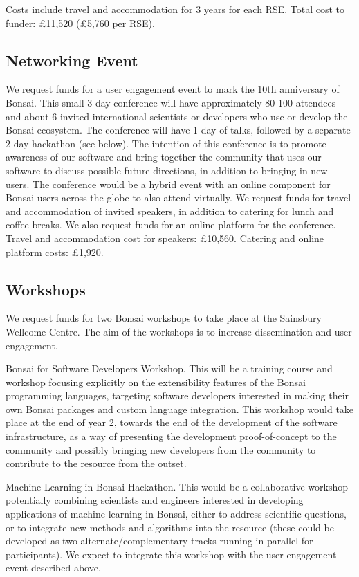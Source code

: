 \documentclass[a4paper,11pt]{article}
\begin{document}
Costs include travel and accommodation for 3 years for each RSE. Total cost to funder: £11,520 (£5,760 per RSE).

\subsection*{Networking Event}

We request funds for a user engagement event to mark the 10th anniversary of Bonsai. This small 3-day conference will have approximately 80-100 attendees and about 6 invited international scientists or developers who use or develop the Bonsai ecosystem. The conference will have 1 day of talks, followed by a separate 2-day hackathon (see below). The intention of this conference is to promote awareness of our software and bring together the community that uses our software to discuss possible future directions, in addition to bringing in new users. The conference would be a hybrid event with an online component for Bonsai users across the globe to also attend virtually. We request funds for travel and accommodation of invited speakers, in addition to catering for lunch and coffee breaks. We also request funds for an online platform for the conference. Travel and accommodation cost for speakers: £10,560. Catering and online platform costs: £1,920.

\subsection{Workshops} 

We request funds for two Bonsai workshops to take place at the Sainsbury Wellcome Centre. The aim of the workshops is to increase dissemination and user engagement. 

Bonsai for Software Developers Workshop. This will be a training course and workshop focusing explicitly on the extensibility features of the Bonsai programming languages, targeting software developers interested in making their own Bonsai packages and custom language integration. This workshop would take place at the end of year 2, towards the end of the development of the software infrastructure, as a way of presenting the development proof-of-concept to the community and possibly bringing new developers from the community to contribute to the resource from the outset.

Machine Learning in Bonsai Hackathon. This would be a collaborative workshop potentially combining scientists and engineers interested in developing applications of machine learning in Bonsai, either to address scientific questions, or to integrate new methods and algorithms into the resource (these could be developed as two alternate/complementary tracks running in parallel for participants). We expect to integrate this workshop with the user engagement event described above.
\end{document}
